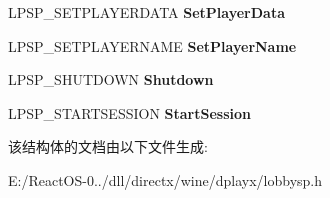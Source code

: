 \begin{DoxyCompactItemize}
\mbox{\label{struct_s_p___c_a_l_l_b_a_c_k_s_a66d1523c04d139d91ba2bf0f11e9b675}} 
L\+P\+S\+P\+\_\+\+S\+E\+T\+P\+L\+A\+Y\+E\+R\+D\+A\+TA {\bfseries Set\+Player\+Data}
\item 
\mbox{\label{struct_s_p___c_a_l_l_b_a_c_k_s_a6918dd347ec1c5d83ecc8b400a31100f}} 
L\+P\+S\+P\+\_\+\+S\+E\+T\+P\+L\+A\+Y\+E\+R\+N\+A\+ME {\bfseries Set\+Player\+Name}
\item 
\mbox{\label{struct_s_p___c_a_l_l_b_a_c_k_s_ac5d207bd1d7da30e74bd4452db0d6549}} 
L\+P\+S\+P\+\_\+\+S\+H\+U\+T\+D\+O\+WN {\bfseries Shutdown}
\item 
\mbox{\label{struct_s_p___c_a_l_l_b_a_c_k_s_ac53c4afcec64f2bbeee24981eec74c9e}} 
L\+P\+S\+P\+\_\+\+S\+T\+A\+R\+T\+S\+E\+S\+S\+I\+ON {\bfseries Start\+Session}
\end{DoxyCompactItemize}


该结构体的文档由以下文件生成\+:\begin{DoxyCompactItemize}
\item 
E\+:/\+React\+O\+S-\/0../dll/directx/wine/dplayx/lobbysp.\+h\end{DoxyCompactItemize}
